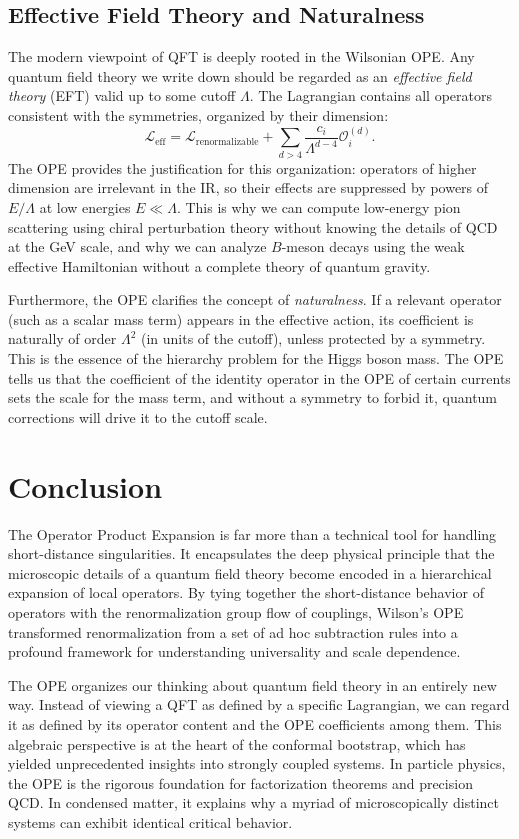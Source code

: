 \documentclass[11pt]{article}
\begin{document}
\subsection{Effective Field Theory and Naturalness}
\label{sec:EFT}
The modern viewpoint of QFT is deeply rooted in the Wilsonian OPE. Any quantum field theory we write down should be regarded as an \emph{effective field theory} (EFT) valid up to some cutoff $\Lambda$. The Lagrangian contains all operators consistent with the symmetries, organized by their dimension:
\[
\mathcal{L}_{\text{eff}} = \mathcal{L}_{\text{renormalizable}} + \sum_{d > 4} \frac{c_i}{\Lambda^{d-4}} \mathcal{O}_i^{(d)} .
\]
The OPE provides the justification for this organization: operators of higher dimension are irrelevant in the IR, so their effects are suppressed by powers of $E/\Lambda$ at low energies $E \ll \Lambda$. This is why we can compute low-energy pion scattering using chiral perturbation theory without knowing the details of QCD at the GeV scale, and why we can analyze $B$-meson decays using the weak effective Hamiltonian without a complete theory of quantum gravity.

Furthermore, the OPE clarifies the concept of \emph{naturalness}. If a relevant operator (such as a scalar mass term) appears in the effective action, its coefficient is naturally of order $\Lambda^2$ (in units of the cutoff), unless protected by a symmetry. This is the essence of the hierarchy problem for the Higgs boson mass. The OPE tells us that the coefficient of the identity operator in the OPE of certain currents sets the scale for the mass term, and without a symmetry to forbid it, quantum corrections will drive it to the cutoff scale.

\section{Conclusion}
\label{sec:conclusion}

The Operator Product Expansion is far more than a technical tool for handling short-distance singularities. It encapsulates the deep physical principle that the microscopic details of a quantum field theory become encoded in a hierarchical expansion of local operators. By tying together the short-distance behavior of operators with the renormalization group flow of couplings, Wilson's OPE transformed renormalization from a set of ad hoc subtraction rules into a profound framework for understanding universality and scale dependence.

The OPE organizes our thinking about quantum field theory in an entirely new way. Instead of viewing a QFT as defined by a specific Lagrangian, we can regard it as defined by its operator content and the OPE coefficients among them. This algebraic perspective is at the heart of the conformal bootstrap, which has yielded unprecedented insights into strongly coupled systems. In particle physics, the OPE is the rigorous foundation for factorization theorems and precision QCD. In condensed matter, it explains why a myriad of microscopically distinct systems can exhibit identical critical behavior.
\end{document}
